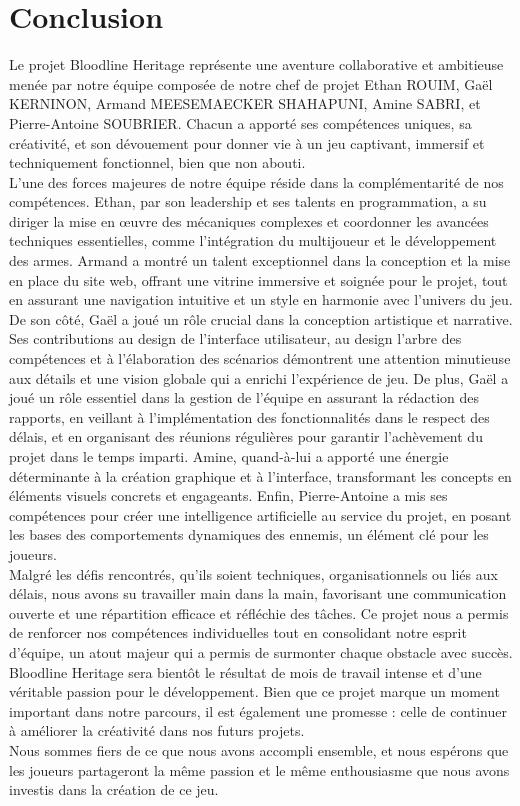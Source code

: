 \documentclass{report}
\begin{document}
\newpage
\chapter*{Conclusion}
Le projet Bloodline Heritage représente une aventure collaborative et ambitieuse menée par notre équipe composée de notre chef de projet Ethan ROUIM, Gaël KERNINON, Armand MEESEMAECKER SHAHAPUNI, Amine SABRI, et Pierre-Antoine SOUBRIER. Chacun a apporté ses compétences uniques, sa créativité, et son dévouement pour donner vie à un jeu captivant, immersif et techniquement fonctionnel, bien que non abouti.
\\[0.4cm]
L’une des forces majeures de notre équipe réside dans la complémentarité de nos compétences. Ethan, par son leadership et ses talents en programmation, a su diriger la mise en œuvre des mécaniques complexes et coordonner les avancées techniques essentielles, comme l’intégration du multijoueur et le développement des armes. Armand a montré un talent exceptionnel dans la conception et la mise en place du site web, offrant une vitrine immersive et soignée pour le projet, tout en assurant une navigation intuitive et un style en harmonie avec l’univers du jeu.
\\[0.4cm]
De son côté, Gaël a joué un rôle crucial dans la conception artistique et narrative. Ses contributions au design de l’interface utilisateur, au design l’arbre des compétences et à l’élaboration des scénarios démontrent une attention minutieuse aux détails et une vision globale qui a enrichi l’expérience de jeu. De plus, Gaël a joué un rôle essentiel dans la gestion de l'équipe en assurant la rédaction des rapports, en veillant à l'implémentation des fonctionnalités dans le respect des délais, et en organisant des réunions régulières pour garantir l'achèvement du projet dans le temps imparti.  Amine, quand-à-lui a apporté une énergie déterminante à la création graphique et à l’interface, transformant les concepts en éléments visuels concrets et engageants. Enfin, Pierre-Antoine a mis ses compétences pour créer une intelligence artificielle au service du projet, en posant les bases des comportements dynamiques des ennemis, un élément clé pour les joueurs.
\\[0.4cm]
Malgré les défis rencontrés, qu'ils soient techniques, organisationnels ou liés aux délais, nous avons su travailler main dans la main, favorisant une communication ouverte et une répartition efficace et réfléchie des tâches. Ce projet nous a permis de renforcer nos compétences individuelles tout en consolidant notre esprit d’équipe, un atout majeur qui a permis de surmonter chaque obstacle avec succès.
\\[0.4cm]
Bloodline Heritage sera bientôt le résultat de mois de travail intense et d’une véritable passion pour le développement. Bien que ce projet marque un moment important dans notre parcours, il est également une promesse : celle de continuer à améliorer la créativité dans nos futurs projets.
\\[0.4cm]
Nous sommes fiers de ce que nous avons accompli ensemble, et nous espérons que les joueurs partageront la même passion et le même enthousiasme que nous avons investis dans la création de ce jeu.
\end{document}
